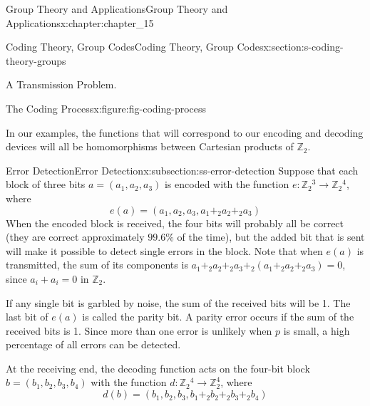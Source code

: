 \documentclass[twoside,10pt,]{book}
\numberwithin{equation}{section}
\begin{document}
\begin{chapterptx}{Group Theory and Applications}{}{Group Theory and Applications}{}{}{x:chapter:chapter_15}
\begin{sectionptx}{Coding Theory, Group Codes}{}{Coding Theory, Group Codes}{}{}{x:section:s-coding-theory-groups}
\begin{introduction}{A Transmission Problem.}
\begin{figureptx}{The Coding Process}{x:figure:fig-coding-process}{}
\begin{image}{0.1}{0.8}{0.1}
\end{image}%
\tcblower
\end{figureptx}%
In our examples, the functions that will correspond to our encoding and decoding devices will all be homomorphisms between Cartesian products of \(\mathbb{Z}_2\).%
\end{introduction}%
%
%
\typeout{************************************************}
\typeout{************************************************}
%
\begin{subsectionptx}{Error Detection}{}{Error Detection}{}{}{x:subsection:ss-error-detection}
Suppose that each block of three bits \(a = \left(a_1, a_2 , a_3 \right)\) is encoded with the function \(e: \mathbb{Z}_2{}^3\to \mathbb{Z}_2{}^4\), where%
\begin{equation*}
e(a) = \left(a _1, a _2 , a _3, a_1+_2a_2+_2a_3 \right)
\end{equation*}
When the encoded block is received, the four bits will probably all be correct (they are correct approximately \(99.6\%\) of the time), but the added bit that is sent will make it possible to detect single errors in the block. Note that when \(e(a)\) is transmitted, the sum of its components is \(a_1+_2 a_2 +_2 a_3+_2 \left( a_1+_2 a_2+_2 a_3\right)= 0\), since  \(a_i+a_i=0\) in \(\mathbb{Z}_2\).%
\par
If any single bit is garbled by noise, the sum of the received bits will be 1. The last bit of \(e(a)\) is called the parity bit. A parity error occurs if the sum of the received bits is 1. Since more than one error is unlikely when \(p\) is small, a high percentage of all errors can be detected.%
\par
At the receiving end, the decoding function acts on the four-bit block \(b = \left(b_1,b _2 ,b_3,b_4 \right)\) with the function  \(d: \mathbb{Z}_2{}^4\to \mathbb{Z}_2^4\), where%
\begin{equation*}
d(b) = \left(b_1,b _2 ,b_3,b_1+_2b _2 +_2b_3+_2b_4 \right)
\end{equation*}

\end{subsectionptx}
\end{sectionptx}
\end{chapterptx}
\end{document}
